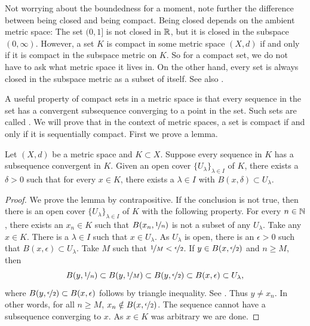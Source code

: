 Not worrying about the boundedness for a moment,
note further the difference between being closed and being compact.  Being
closed depends on the ambient metric space:
The set $(0,1]$ is not closed in ${\mathbb{R}}$,
but it is closed in the subspace $(0,\infty)$.
However, a set $K$ is compact
in some metric space $(X,d)$ if and only if it is compact in the subspace
metric on $K$.  So for a compact set, we do not have to ask
what metric space it lives in.
On the other hand, every set is always closed in the 
subspace metric as a subset of itself.
See also .

A useful property of compact sets in a metric space is that every
sequence in the set has a convergent subsequence converging
to a point in the set.
Such sets are called
\emph{}.
We will prove that in the
context of metric spaces, a set is compact if and only if it is sequentially
compact.
First we prove a lemma.

\begin{lemma}\label{ms:lebesgue}
Let $(X,d)$ be a metric space and $K \subset X$.  Suppose 
every sequence in $K$ has a subsequence convergent in $K$.  Given
an open cover $\{ U_\lambda \}_{\lambda \in I}$ of $K$, there exists a
$\delta > 0$ such that for every $x \in K$, there exists a $\lambda \in I$
with $B(x,\delta) \subset U_\lambda$.
\end{lemma}

\begin{proof}
We prove the lemma by contrapositive.
If the conclusion is not true, then
there is
an open cover $\{ U_\lambda \}_{\lambda \in I}$ of $K$ with
the following property.
For every $n \in {\mathbb{N}}$, there exists an $x_n \in K$ such that
$B(x_n,\nicefrac{1}{n})$ is not a subset of any $U_\lambda$.
Take any $x \in K$.  There is
a $\lambda \in I$ such that $x \in U_\lambda$.  As $U_\lambda$ is open,
there is an $\epsilon > 0$ 
such that $B(x,\epsilon) \subset U_\lambda$.  Take $M$ such that
$\nicefrac{1}{M} < \nicefrac{\epsilon}{2}$.  If $y \in 
B(x,\nicefrac{\epsilon}{2})$ and $n \geq M$, then 
\begin{equation*}
B(y,\nicefrac{1}{n}) \subset
B(y,\nicefrac{1}{M}) \subset
B(y,\nicefrac{\epsilon}{2}) \subset B(x,\epsilon)
\subset U_\lambda ,
\end{equation*}
where 
$B(y,\nicefrac{\epsilon}{2}) \subset B(x,\epsilon)$
follows by triangle inequality.
See .
Thus $y \not= x_n$.
In other words, for all $n \geq M$, $x_n \notin B(x,\nicefrac{\epsilon}{2})$. 
The sequence cannot have a subsequence converging to $x$.  As $x \in K$ was
arbitrary we are done.
\end{proof}

